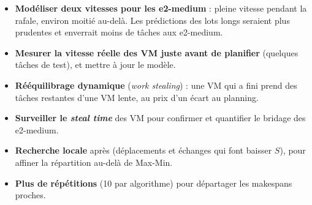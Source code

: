 \begin{itemize}
  \item \textbf{Modéliser deux vitesses pour les e2-medium} : pleine vitesse
        pendant la rafale, environ moitié au-delà. Les prédictions des lots longs
        seraient plus prudentes et \sel{} enverrait moins de tâches aux e2-medium.
  \item \textbf{Mesurer la vitesse réelle des VM juste avant de planifier} (quelques
        tâches de test), et mettre à jour le modèle.
  \item \textbf{Rééquilibrage dynamique} (\emph{work stealing}) : une VM qui a fini
        prend des tâches restantes d'une VM lente, au prix d'un écart au planning.
  \item \textbf{Surveiller le \emph{steal time}} des VM pour confirmer et quantifier
        le bridage des e2-medium.
  \item \textbf{Recherche locale} après \sel{} (déplacements et échanges qui font
        baisser $S$), pour affiner la répartition au-delà de Max-Min.
  \item \textbf{Plus de répétitions} (10 par algorithme) pour départager les
        makespans proches.
\end{itemize}
